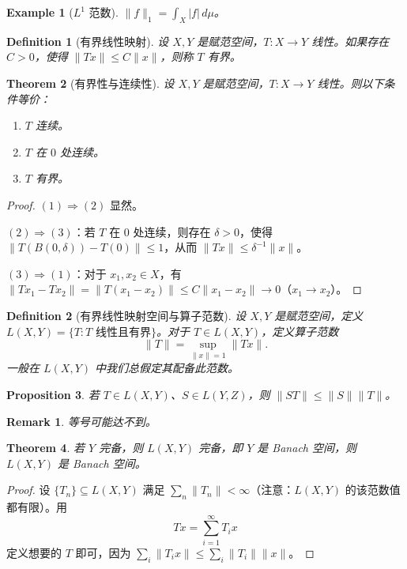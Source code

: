 \documentclass[12pt,letterpaper,twoside,openright]{ctexbook}
\theoremstyle{bluehead}
\newtheorem{theorem}{Theorem}
\newtheorem{proposition}[theorem]{Proposition}
\theoremstyle{olivehead}
\newtheorem{definition}{Definition}
\theoremstyle{orangehead}
\newtheorem{example}[theorem]{Example}
\theoremstyle{redremark}
\newtheorem*{remark}{Remark}
\begin{document}
\begin{example}[$L^1$ 范数]
$\|f\|_1=\int_X|f|\,d\mu$。
\end{example}

\begin{definition}[有界线性映射]
设 $X,Y$ 是赋范空间，$T:X\to Y$ 线性。如果存在 $C>0$，使得 $\|Tx\|\leq C\|x\|$，则称 $T$ 有界。
\end{definition}

\begin{theorem}[有界性与连续性]
设 $X,Y$ 是赋范空间，$T:X\to Y$ 线性。则以下条件等价：
\begin{enumerate}
\item[(1)] $T$ 连续。
\item[(2)] $T$ 在 $0$ 处连续。
\item[(3)] $T$ 有界。
\end{enumerate}
\end{theorem}
\begin{proof}
$(1)\Rightarrow(2)$ 显然。

$(2)\Rightarrow(3)$：若 $T$ 在 $0$ 处连续，则存在 $\delta>0$，使得 $\|T(B(0,\delta))-T(0)\|\leq1$，从而 $\|Tx\|\leq\delta^{-1}\|x\|$。

$(3)\Rightarrow(1)$：对于 $x_1,x_2\in X$，有 $\|Tx_1-Tx_2\|=\|T(x_1-x_2)\|\leq C\|x_1-x_2\|\to0$（$x_1\to x_2$）。
\end{proof}

\begin{definition}[有界线性映射空间与算子范数]
设 $X,Y$ 是赋范空间，定义 $L(X,Y)=\{T:T\text{ 线性且有界}\}$。对于 $T\in L(X,Y)$，定义算子范数
\[
\|T\|=\sup_{\|x\|=1}\|Tx\|.
\]
一般在 $L(X,Y)$ 中我们总假定其配备此范数。
\end{definition}

\begin{proposition}
若 $T\in L(X,Y)$、$S\in L(Y,Z)$，则 $\|ST\|\leq\|S\|\|T\|$。
\end{proposition}
\begin{remark}
等号可能达不到。
\end{remark}

\begin{theorem}
若 $Y$ 完备，则 $L(X,Y)$ 完备，即 $Y$ 是 Banach 空间，则 $L(X,Y)$ 是 Banach 空间。
\end{theorem}
\begin{proof}
设 $\{T_n\}\subseteq L(X,Y)$ 满足 $\sum_n\|T_n\|<\infty$（注意：$L(X,Y)$ 的该范数值都有限）。用
\[
Tx=\sum_{i=1}^{\infty}T_ix
\]
定义想要的 $T$ 即可，因为 $\sum_i\|T_ix\|\leq\sum_i\|T_i\|\|x\|$。
\end{proof}
\end{document}
